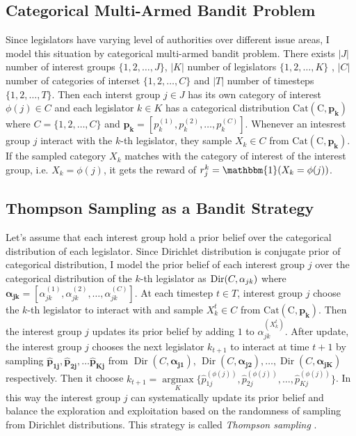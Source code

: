 \documentclass{article}
\begin{document}
\subsection{Categorical Multi-Armed Bandit Problem} \label{vanilla}
Since legislators have varying level of authorities over different issue areas,
I model this situation by categorical multi-armed bandit problem. There exists $|J|$ number of interest groups 
$\{1, 2, \hdots, J\}$, $|K|$ number of legislators $\{1, 2, \hdots, K\}$ 
, $|C|$ number of categories of interset $\{1,2, \hdots, C\}$ and
$|T|$ number of timesteps $\{1,2, \hdots, T\}$.  
Then each interst group $j \in J$ has its 
own category of interest $\phi(j) \in C$ and
each legislator $k \in K$ has a categorical distribution 
$\operatorname{Cat(C, \mathbf{p_k})}$ where
$C=\{1,2,\hdots, C\}$ and $\mathbf{p_k} = [p_k^{(1)}, p_k^{(2)}, \hdots, p_k^{(C)}]$.
Whenever an intesrest group $j$ interact with the $k$-th legislator, they
sample $X_k \in C$ from $\operatorname{Cat(C, \mathbf{p_k})}$.
If the sampled category $X_k$ matches with the category of interest of the interest group, i.e. 
$X_k = \phi(j)$,
it gets the reward of $r_j^k = \mathbbm{1}(X_{k} = \phi(j))$.

\subsection{Thompson Sampling as a Bandit Strategy}
Let's assume that 
each interest group
hold a prior belief over the 
categorical distribution of each legislator.
Since Dirichlet distribution is conjugate prior of categorical distribution,
I model the prior belief of each interest group $j$ over the categorical distribution of the $k$-th legislator as
$\operatorname{Dir}(C, \boldmath{\alpha}_{jk})$ where 
$\mathbf{\alpha_{jk}} = [\alpha_{jk}^{(1)}, \alpha_{jk}^{(2)}, \hdots, \alpha_{jk}^{(C)}]$.
At each timestep $t\in T$, interest group $j$ choose the $k$-th legislator to 
interact with and sample $X_k^t \in C$ from $\operatorname{Cat(C, \mathbf{p_k})}$.
Then the interest group $j$ updates its prior belief by adding $1$ to $\alpha_{jk}^{(X_k^t)}$.
After update, the interest group $j$ chooses the next legislator $k_{t+1}$ 
to interact at time $t+1$
by sampling $\mathbf{\hat{p}_{1j}}, \mathbf{\hat{p}_{2j}}, \hdots \mathbf{\hat{p}_{Kj}}$ 
from $\operatorname{Dir}(C, \mathbf{\alpha_{j1}})$,  $\operatorname{Dir}(C, \mathbf{\alpha_{j2}}), \hdots, \operatorname{Dir}(C, \mathbf{\alpha_{jK}})$ respectively.
Then it
choose $k_{t+1} = \underset{K}{\operatorname{argmax}}\{\hat{p}^{(\phi(j))}_{1j}, \hat{p}^{(\phi(j))}_{2j}, \hdots, \hat{p}^{(\phi(j))}_{Kj}\}$.
In this way the interest group $j$ can systematically update
its prior belief and
balance the exploration and exploitation based on the 
randomness of sampling from Dirichlet distributions.
This strategy is called \textit{Thompson sampling} \citep{tom}.
\end{document}
